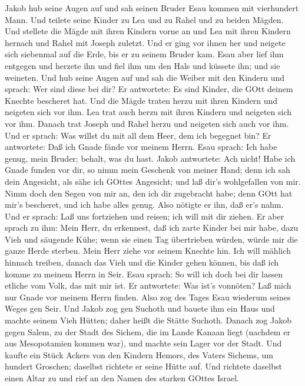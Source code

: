  Jakob hub seine Augen auf und sah seinen Bruder Esau kommen
mit vierhundert Mann. Und teilete seine Kinder zu Lea und zu Rahel und
zu beiden Mägden.  Und stellete die Mägde mit ihren Kindern
vorne an und Lea mit ihren Kindern hernach und Rahel mit Joseph zuletzt.
 Und er ging vor ihnen her und neigete sich siebenmal auf
die Erde, bis er zu seinem Bruder kam.  Esau aber lief ihm
entgegen und herzete ihn und fiel ihm um den Hals und küssete ihn; und
sie weineten.  Und hub seine Augen auf und sah die Weiber
mit den Kindern und sprach: Wer sind diese bei dir? Er antwortete: Es
sind Kinder, die GOtt deinem Knechte bescheret hat.  Und die
Mägde traten herzu mit ihren Kindern und neigeten sich vor ihm.
 Lea trat auch herzu mit ihren Kindern und neigeten sich vor
ihm. Danach trat Joseph und Rahel herzu und neigeten sich auch vor ihm.
 Und er sprach: Was willst du mit all dem Heer, dem ich
begegnet bin? Er antwortete: Daß ich Gnade fände vor meinem Herrn.
 Esau sprach: Ich habe genug, mein Bruder; behalt, was du
hast.  Jakob antwortete: Ach nicht! Habe ich Gnade funden
vor dir, so nimm mein Geschenk von meiner Hand; denn ich sah dein
Angesicht, als sähe ich GOttes Angesicht; und laß dir's wohlgefallen von
mir.  Nimm doch den Segen von mir an, den ich dir
zugebracht habe; denn GOtt hat mir's bescheret, und ich habe alles
genug. Also nötigte er ihn, daß er's nahm.  Und er sprach:
Laß uns fortziehen und reisen; ich will mit dir ziehen.  Er
aber sprach zu ihm: Mein Herr, du erkennest, daß ich zarte Kinder bei
mir habe, dazu Vieh und säugende Kühe; wenn sie einen Tag übertrieben
würden, würde mir die ganze Herde sterben.  Mein Herr ziehe
vor seinem Knechte hin. Ich will mählich hinnach treiben, danach das
Vieh und die Kinder gehen können, bis daß ich komme zu meinem Herrn in
Seir.  Esau sprach: So will ich doch bei dir lassen etliche
vom Volk, das mit mir ist. Er antwortete: Was ist's vonnöten? Laß mich
nur Gnade vor meinem Herrn finden.  Also zog des Tages Esau
wiederum seines Weges gen Seir.  Und Jakob zog gen Suchoth
und bauete ihm ein Haus und machte seinem Vieh Hütten; daher heißt die
Stätte Suchoth.  Danach zog Jakob gegen Salem, zu der Stadt
des Sichem, die im Lande Kanaan liegt (nachdem er aus Mesopotamien
kommen war), und machte sein Lager vor der Stadt.  Und
kaufte ein Stück Ackers von den Kindern Hemors, des Vaters Sichems, um
hundert Groschen; daselbst richtete er seine Hütte auf. 
Und richtete daselbst einen Altar zu und rief an den Namen des starken
GOttes Israel.


